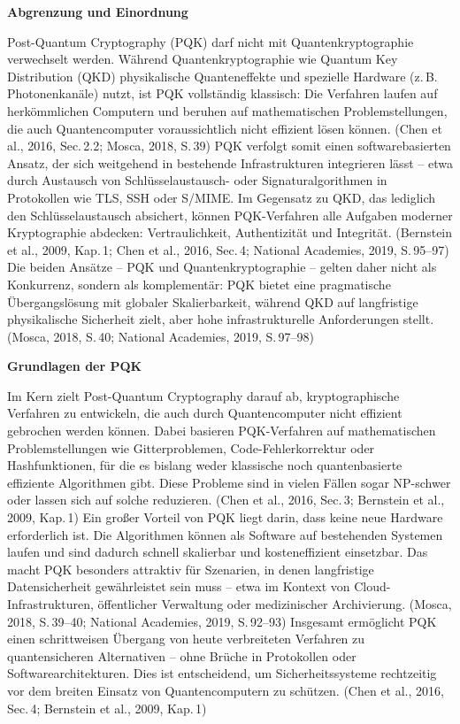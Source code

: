 \vspace{1em}
\noindent\textbf{Abgrenzung und Einordnung}

\noindent
Post-Quantum Cryptography (PQK) darf nicht mit Quantenkryptographie verwechselt werden. Während Quantenkryptographie wie Quantum Key Distribution (QKD) physikalische Quanteneffekte und spezielle Hardware (z. B. Photonenkanäle) nutzt, ist PQK vollständig klassisch: Die Verfahren laufen auf herkömmlichen Computern und beruhen auf mathematischen Problemstellungen, die auch Quantencomputer voraussichtlich nicht effizient lösen können.
 (Chen et al., 2016, Sec. 2.2; Mosca, 2018, S. 39)
PQK verfolgt somit einen softwarebasierten Ansatz, der sich weitgehend in bestehende Infrastrukturen integrieren lässt – etwa durch Austausch von Schlüsselaustausch- oder Signaturalgorithmen in Protokollen wie TLS, SSH oder S/MIME. Im Gegensatz zu QKD, das lediglich den Schlüsselaustausch absichert, können PQK-Verfahren alle Aufgaben moderner Kryptographie abdecken: Vertraulichkeit, Authentizität und Integrität.
 (Bernstein et al., 2009, Kap. 1; Chen et al., 2016, Sec. 4; National Academies, 2019, S. 95–97)
Die beiden Ansätze – PQK und Quantenkryptographie – gelten daher nicht als Konkurrenz, sondern als komplementär: PQK bietet eine pragmatische Übergangslösung mit globaler Skalierbarkeit, während QKD auf langfristige physikalische Sicherheit zielt, aber hohe infrastrukturelle Anforderungen stellt.
 (Mosca, 2018, S. 40; National Academies, 2019, S. 97–98)


\vspace{1em}
\noindent\textbf{Grundlagen der PQK}

\noindent
Im Kern zielt Post-Quantum Cryptography darauf ab, kryptographische Verfahren zu entwickeln, die auch durch Quantencomputer nicht effizient gebrochen werden können. Dabei basieren PQK-Verfahren auf mathematischen Problemstellungen wie Gitterproblemen, Code-Fehlerkorrektur oder Hashfunktionen, für die es bislang weder klassische noch quantenbasierte effiziente Algorithmen gibt. Diese Probleme sind in vielen Fällen sogar NP-schwer oder lassen sich auf solche reduzieren.
 (Chen et al., 2016, Sec. 3; Bernstein et al., 2009, Kap. 1)
Ein großer Vorteil von PQK liegt darin, dass keine neue Hardware erforderlich ist. Die Algorithmen können als Software auf bestehenden Systemen laufen und sind dadurch schnell skalierbar und kosteneffizient einsetzbar. Das macht PQK besonders attraktiv für Szenarien, in denen langfristige Datensicherheit gewährleistet sein muss – etwa im Kontext von Cloud-Infrastrukturen, öffentlicher Verwaltung oder medizinischer Archivierung.
 (Mosca, 2018, S. 39–40; National Academies, 2019, S. 92–93)
Insgesamt ermöglicht PQK einen schrittweisen Übergang von heute verbreiteten Verfahren zu quantensicheren Alternativen – ohne Brüche in Protokollen oder Softwarearchitekturen. Dies ist entscheidend, um Sicherheitssysteme rechtzeitig vor dem breiten Einsatz von Quantencomputern zu schützen.
 (Chen et al., 2016, Sec. 4; Bernstein et al., 2009, Kap. 1)

